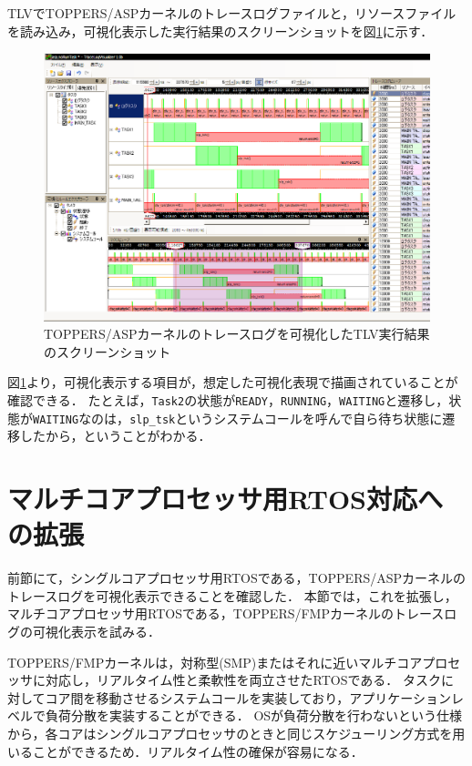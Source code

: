 TLVでTOPPERS/ASPカーネルのトレースログファイルと，リソースファイルを読み込み，可視化表示した実行結果のスクリーンショットを図\ref{fig:aspTLVscreenShot}に示す．

\begin{figure}[tb]
\begin{center}
\includegraphics[width=15cm]{img/aspTLVscreenShot.eps}
\caption{TOPPERS/ASPカーネルのトレースログを可視化したTLV実行結果のスクリーンショット}
\label{fig:aspTLVscreenShot}
\end{center}
\end{figure}

図\ref{fig:aspTLVscreenShot}より，可視化表示する項目が，想定した可視化表現で描画されていることが確認できる．
たとえば，{\tt Task2}の状態が{\tt READY}，{\tt RUNNING}，{\tt WAITING}と遷移し，状態が{\tt WAITING}なのは，{\tt slp\_tsk}というシステムコールを呼んで自ら待ち状態に遷移したから，ということがわかる．

\section{マルチコアプロセッサ用RTOS対応への拡張}

前節にて，シングルコアプロセッサ用RTOSである，TOPPERS/ASPカーネルのトレースログを可視化表示できることを確認した．
本節では，これを拡張し，マルチコアプロセッサ用RTOSである，TOPPERS/FMPカーネル\cite{TOPPERS}のトレースログの可視化表示を試みる．

TOPPERS/FMPカーネルは，対称型(SMP)またはそれに近いマルチコアプロセッサに対応し，リアルタイム性と柔軟性を両立させたRTOSである．
タスクに対してコア間を移動させるシステムコールを実装しており，アプリケーションレベルで負荷分散を実装することができる．
OSが負荷分散を行わないという仕様から，各コアはシングルコアプロセッサのときと同じスケジューリング方式を用いることができるため．リアルタイム性の確保が容易になる．

